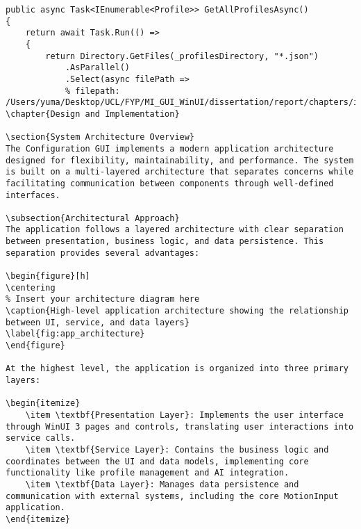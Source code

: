 \begin{verbatim}
public async Task<IEnumerable<Profile>> GetAllProfilesAsync()
{
    return await Task.Run(() =>
    {
        return Directory.GetFiles(_profilesDirectory, "*.json")
            .AsParallel()
            .Select(async filePath =>
            % filepath: /Users/yuma/Desktop/UCL/FYP/MI_GUI_WinUI/dissertation/report/chapters/implementation.tex
\chapter{Design and Implementation}

\section{System Architecture Overview}
The Configuration GUI implements a modern application architecture designed for flexibility, maintainability, and performance. The system is built on a multi-layered architecture that separates concerns while facilitating communication between components through well-defined interfaces.

\subsection{Architectural Approach}
The application follows a layered architecture with clear separation between presentation, business logic, and data persistence. This separation provides several advantages:

\begin{figure}[h]
\centering
% Insert your architecture diagram here
\caption{High-level application architecture showing the relationship between UI, service, and data layers}
\label{fig:app_architecture}
\end{figure}

At the highest level, the application is organized into three primary layers:

\begin{itemize}
    \item \textbf{Presentation Layer}: Implements the user interface through WinUI 3 pages and controls, translating user interactions into service calls.
    \item \textbf{Service Layer}: Contains the business logic and coordinates between the UI and data models, implementing core functionality like profile management and AI integration.
    \item \textbf{Data Layer}: Manages data persistence and communication with external systems, including the core MotionInput application.
\end{itemize}


\end{verbatim}
